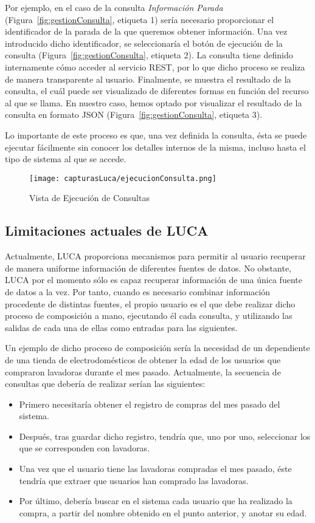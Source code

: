 Por ejemplo, en el caso de la consulta \emph{Información Parada} (Figura~\ref{fig:gestionConsulta}, etiqueta 1) sería necesario proporcionar el identificador de la parada de la que queremos obtener información. Una vez introducido dicho identificador, se seleccionaría el botón de ejecución de la consulta (Figura~\ref{fig:gestionConsulta}, etiqueta 2). La consulta tiene definido internamente cómo acceder al servicio REST, por lo que dicho proceso se realiza de manera transparente al usuario. Finalmente, se muestra el resultado de la consulta, el cuál puede ser visualizado de diferentes formas en función del recurso al que se llama. En nuestro caso, hemos optado por visualizar el resultado de la consulta en formato JSON (Figura~\ref{fig:gestionConsulta}, etiqueta 3).

Lo importante de este proceso es que, una vez definida la consulta, ésta se puede ejecutar fácilmente sin conocer los detalles internos de la misma, incluso hasta el tipo de sistema al que se accede.


	\begin{figure}[!tb]
		\centering
		\texttt{[image: capturasLuca/ejecucionConsulta.png]}
		\caption{Vista de Ejecución de Consultas}\label{fig:ejecucionConsultas}
	\end{figure}

\subsection{Limitaciones actuales de LUCA}

Actualmente, LUCA proporciona mecanismos para permitir al usuario recuperar de manera uniforme información de diferentes fuentes de datos. No obstante, LUCA por el momento sólo es capaz recuperar información de una única fuente de datos a la vez. Por tanto, cuando es necesario combinar información procedente de distintas fuentes, el propio usuario es el que debe realizar dicho proceso de composición a mano, ejecutando él cada consulta, y utilizando las salidas de cada una de ellas como entradas para las siguientes.


Un ejemplo de dicho proceso de composición sería la necesidad de un dependiente de una tienda de electrodomésticos de obtener la edad de los usuarios que compraron lavadoras durante el mes pasado. Actualmente, la secuencia de consultas que debería de realizar serían las siguientes:

\begin{itemize}
	\item Primero necesitaría obtener el registro de compras del mes pasado del sistema.
	\item Después, tras guardar dicho registro, tendría que, uno por uno, seleccionar los que se corresponden con lavadoras.
	\item Una vez que el usuario tiene las lavadoras compradas el mes pasado, éste tendría que extraer que usuarios han comprado las lavadoras.
	\item Por último, debería buscar en el sistema cada usuario que ha realizado la compra, a partir del nombre obtenido en el punto anterior, y anotar su edad.
\end{itemize}

